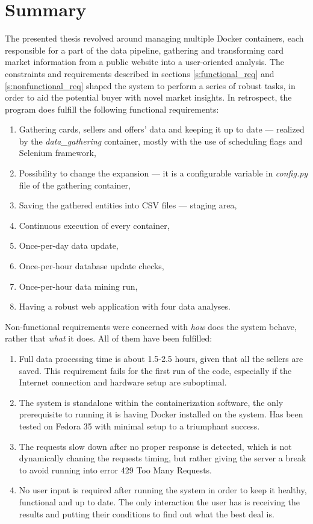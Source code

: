 \chapter{Summary}
\label{ch:summary}
The presented thesis revolved around managing multiple Docker containers, each responsible for a part of the data pipeline, gathering and transforming card market information from a public website into a user-oriented analysis. The constraints and requirements described in sections \ref{s:functional_req} and \ref{s:nonfunctional_req} shaped the system to perform a series of robust tasks, in order to aid the potential buyer with novel market insights. In retrospect, the program does fulfill the following functional requirements:

\begin{enumerate}
    \item Gathering cards, sellers and offers' data and keeping it up to date --- realized by the \textit{data\_gathering} container, mostly with the use of scheduling flags and Selenium framework,
    \item Possibility to change the expansion --- it is a configurable variable in \textit{config.py} file of the gathering container,
    \item Saving the gathered entities into CSV files --- staging area,
    \item Continuous execution of every container,
    \item Once-per-day data update,
    \item Once-per-hour database update checks,
    \item Once-per-hour data mining run,
    \item Having a robust web application with four data analyses.
\end{enumerate}

Non-functional requirements were concerned with \textit{how} does the system behave, rather that \textit{what} it does. All of them have been fulfilled:
\begin{enumerate}
    \item Full data processing time is about 1.5-2.5 hours, given that all the sellers are saved. This requirement fails for the first run of the code, especially if the Internet connection and hardware setup are suboptimal.
    \item The system is standalone within the containerization software, the only prerequisite to running it is having Docker installed on the system. Has been tested on Fedora 35 with minimal setup to a triumphant success.
    \item The requests slow down after no proper response is detected, which is not dynamically chaning the requests timing, but rather giving the server a break to avoid running into error 429 Too Many Requests.
    \item No user input is required after running the system in order to keep it healthy, functional and up to date. The only interaction the user has is receiving the results and putting their conditions to find out what the best deal is.
\end{enumerate}

